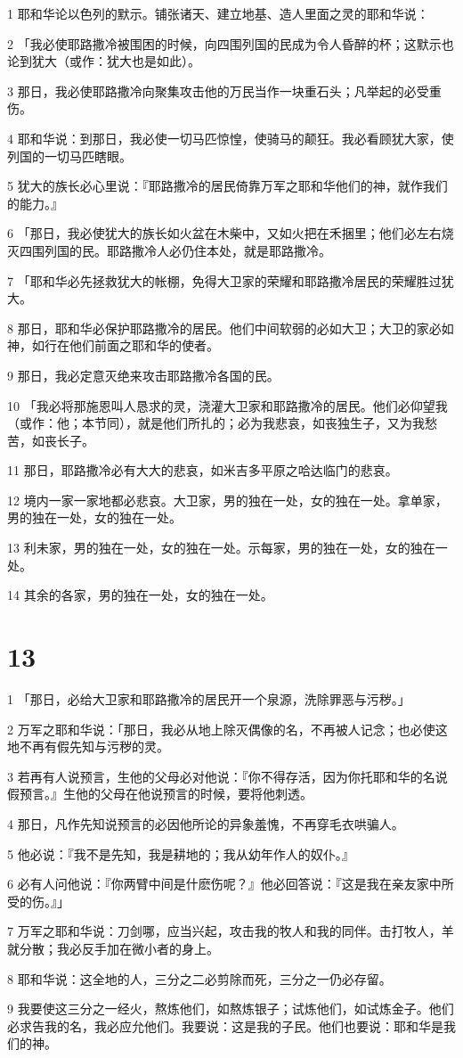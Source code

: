 \par 1 耶和华论以色列的默示。铺张诸天、建立地基、造人里面之灵的耶和华说：
\par 2 「我必使耶路撒冷被围困的时候，向四围列国的民成为令人昏醉的杯；这默示也论到犹大（或作：犹大也是如此）。
\par 3 那日，我必使耶路撒冷向聚集攻击他的万民当作一块重石头；凡举起的必受重伤。
\par 4 耶和华说：到那日，我必使一切马匹惊惶，使骑马的颠狂。我必看顾犹大家，使列国的一切马匹瞎眼。
\par 5 犹大的族长必心里说：『耶路撒冷的居民倚靠万军之耶和华他们的神，就作我们的能力。』
\par 6 「那日，我必使犹大的族长如火盆在木柴中，又如火把在禾捆里；他们必左右烧灭四围列国的民。耶路撒冷人必仍住本处，就是耶路撒冷。
\par 7 「耶和华必先拯救犹大的帐棚，免得大卫家的荣耀和耶路撒冷居民的荣耀胜过犹大。
\par 8 那日，耶和华必保护耶路撒冷的居民。他们中间软弱的必如大卫；大卫的家必如神，如行在他们前面之耶和华的使者。
\par 9 那日，我必定意灭绝来攻击耶路撒冷各国的民。
\par 10 「我必将那施恩叫人恳求的灵，浇灌大卫家和耶路撒冷的居民。他们必仰望我（或作：他；本节同），就是他们所扎的；必为我悲哀，如丧独生子，又为我愁苦，如丧长子。
\par 11 那日，耶路撒冷必有大大的悲哀，如米吉多平原之哈达临门的悲哀。
\par 12 境内一家一家地都必悲哀。大卫家，男的独在一处，女的独在一处。拿单家，男的独在一处，女的独在一处。
\par 13 利未家，男的独在一处，女的独在一处。示每家，男的独在一处，女的独在一处。
\par 14 其余的各家，男的独在一处，女的独在一处。

\chapter{13}

\par 1 「那日，必给大卫家和耶路撒冷的居民开一个泉源，洗除罪恶与污秽。」
\par 2 万军之耶和华说：「那日，我必从地上除灭偶像的名，不再被人记念；也必使这地不再有假先知与污秽的灵。
\par 3 若再有人说预言，生他的父母必对他说：『你不得存活，因为你托耶和华的名说假预言。』生他的父母在他说预言的时候，要将他刺透。
\par 4 那日，凡作先知说预言的必因他所论的异象羞愧，不再穿毛衣哄骗人。
\par 5 他必说：『我不是先知，我是耕地的；我从幼年作人的奴仆。』
\par 6 必有人问他说：『你两臂中间是什麽伤呢？』他必回答说：『这是我在亲友家中所受的伤。』」
\par 7 万军之耶和华说：刀剑哪，应当兴起，攻击我的牧人和我的同伴。击打牧人，羊就分散；我必反手加在微小者的身上。
\par 8 耶和华说：这全地的人，三分之二必剪除而死，三分之一仍必存留。
\par 9 我要使这三分之一经火，熬炼他们，如熬炼银子；试炼他们，如试炼金子。他们必求告我的名，我必应允他们。我要说：这是我的子民。他们也要说：耶和华是我们的神。

